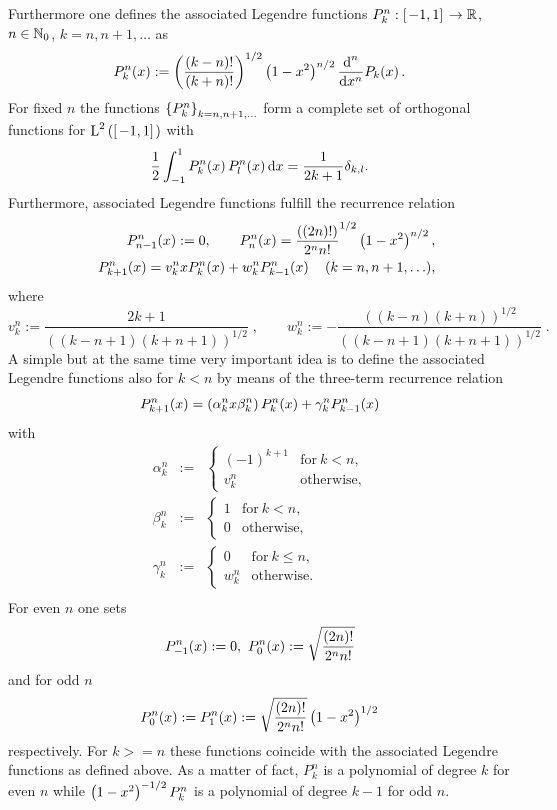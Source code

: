 Furthermore one defines the associated Legendre functions $P_k^n : \left[\left.-1,1\right]\right. \rightarrow \mathbb{R}$, 
$n \in \mathbb{N}_{0}$, $k=n,n+1,\ldots$ as 
\begin{equation}
  \nonumber
  P_k^n{\hspace{-0.4ex}}\left(x\right) := \left(\frac{\left(k-n\right)!}{\left(k+n\right)!}\right)^{1/2}
  \left(1-x^2\right)^{n/2} \frac{\text{\rm{d}}^n}{\text{\rm{d}} x^n} P_k{\hspace{-0.4ex}}\left(x\right).
\end{equation}
For fixed $n$ the functions $\left\{P_{k}^n\right\rbrace_{k=n,n+1,\ldots}$ form a complete set of orthogonal functions 
for $\text{\rm{L}}^{2}\left(\left[\left.-1,1\right]\right.\right)$ with
$$ \frac{1}{2} \int_{-1}^{1} P_{k}^n{\hspace{-0.4ex}}\left(x\right) P_{l}^n{\hspace{-0.4ex}}\left(x\right) \text{\rm{d}} x = \frac{1}{2k+1} \delta_{k,l}.$$
Furthermore, associated Legendre functions fulfill the recurrence relation
\begin{eqnarray*}
  & & P_{n-1}^n{\hspace{-0.4ex}}\left(x\right) := 0,\qquad P_{n}^n{\hspace{-0.4ex}}\left(x\right) = \frac{((2n)!)}{2^n n!}^{1/2} \left(1-x^2\right)^{n/2},\\
  & & P_{k+1}^n{\hspace{-0.4ex}}\left(x\right) = v_{k}^n x P_{k}^n{\hspace{-0.4ex}}\left(x\right) + w_{k}^n P_{k-1}^n{\hspace{-0.4ex}}\left(x\right) \quad (k = n,n+1,\ldots),
\end{eqnarray*}
where
$$ v_{k}^n := \frac{2k+1}{((k-n+1)(k+n+1))^{1/2}}\; ,\qquad w_{k}^n := - \frac{((k-n)(k+n))^{1/2}}{((k-n+1)(k+n+1))^{1/2}}\; .$$
A simple but at the same time very important idea is to define the associated Legendre functions also for 
$k < n$ by means of the three-term recurrence relation
$$ P_{k+1}^n{\hspace{-0.4ex}}\left(x\right) = \left(\alpha_{k}^n x \beta_{k}^n\right) P_{k}^n{\hspace{-0.4ex}}\left(x\right) + \gamma_{k}^n P_{k-1}^n{\hspace{-0.4ex}}\left(x\right) $$
with
\begin{eqnarray*}
  \alpha_{k}^n & := & \left\{
    \begin{array}{ll}
      (-1)^{k+1} & \text{for}\ k < n,\\
      v_{k}^n    & \text{otherwise},
    \end{array}\right.\\
  \beta_{k}^n & := & \left\{
    \begin{array}{lll}
      1 & \text{for}\ k < n,\\
      0 & \text{otherwise},
    \end{array}\right.\\
  \gamma_{k}^n & := & \left\{
    \begin{array}{lll}
      0       & \text{for}\ k \leq n,\\
      w_{k}^n & \text{otherwise.}
    \end{array}\right.\\
\end{eqnarray*}
For even $n$ one sets 
$$ \fun{P_{-1}^n}{x} := 0,\ \fun{P_{0}^n}{x} := \sqrt{\frac{(2n)!}{2^n n!}}$$
and for odd $n$
$$ P_{0}^n{\hspace{-0.4ex}}\left(x\right) := P_{1}^n{\hspace{-0.4ex}}\left(x\right) := \sqrt{\frac{(2n)!}{2^n n!}} \left(1-x^2\right)^{1/2}$$
respectively. For $k >= n$ these functions coincide with the associated Legendre functions as defined above. 
As a matter of fact, $P_{k}^n$ is a polynomial of degree $k$ for even $n$ while $\left(1-x^2\right)^{-1/2}P_{k}^n$
is a polynomial of degree $k-1$ for odd $n$.


